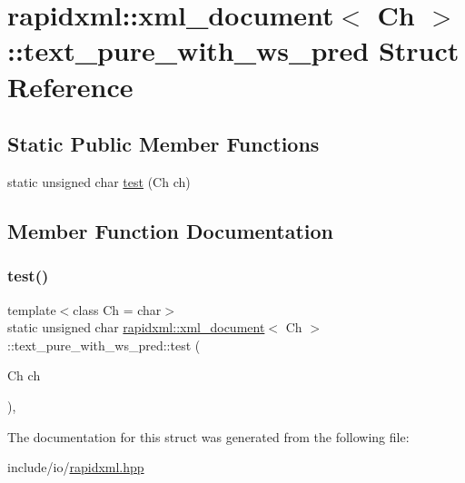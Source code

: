 \hypertarget{structrapidxml_1_1xml__document_1_1text__pure__with__ws__pred}{}\section{rapidxml\+::xml\+\_\+document$<$ Ch $>$\+::text\+\_\+pure\+\_\+with\+\_\+ws\+\_\+pred Struct Reference}
\label{structrapidxml_1_1xml__document_1_1text__pure__with__ws__pred}
\subsection*{Static Public Member Functions}
\begin{DoxyCompactItemize}
\item 
static unsigned char \mbox{\hyperlink{structrapidxml_1_1xml__document_1_1text__pure__with__ws__pred_a8f8d13fe0128d11626434ee4b95f5085}{test}} (Ch ch)
\end{DoxyCompactItemize}


\subsection{Member Function Documentation}
\mbox{\label{structrapidxml_1_1xml__document_1_1text__pure__with__ws__pred_a8f8d13fe0128d11626434ee4b95f5085}} 
\subsubsection{\texorpdfstring{test()}{test()}}
{\footnotesize\ttfamily template$<$class Ch = char$>$ \\
static unsigned char \mbox{\hyperlink{classrapidxml_1_1xml__document}{rapidxml\+::xml\+\_\+document}}$<$ Ch $>$\+::text\+\_\+pure\+\_\+with\+\_\+ws\+\_\+pred\+::test (\begin{DoxyParamCaption}\item[{Ch}]{ch }\end{DoxyParamCaption})\hspace{0.3cm}{\ttfamily [inline]}, {\ttfamily [static]}}



The documentation for this struct was generated from the following file\+:\begin{DoxyCompactItemize}
\item 
include/io/\mbox{\hyperlink{rapidxml_8hpp}{rapidxml.\+hpp}}\end{DoxyCompactItemize}
